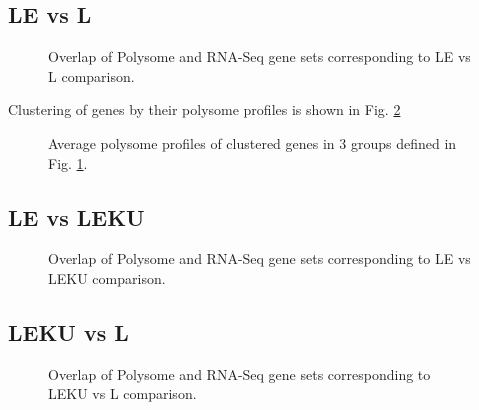 \documentclass[12pt]{article} %
\begin{document}
\subsection{LE vs L} %
\begin{figure}[H] %
\caption{Overlap of Polysome and RNA-Seq gene sets corresponding to LE vs L comparison.}
\label{fig:venn-correlations-LE-L}
\end{figure}

Clustering of genes by their polysome profiles is shown in Fig. \ref{fig:correlations-LE-L}

\begin{figure}[H] %
\caption{Average polysome profiles of clustered genes in 3 groups defined in Fig. \ref{fig:venn-correlations-LE-L}.}
\label{fig:correlations-LE-L}
\end{figure}

\subsection{LE vs LEKU} %
\begin{figure}[H] %
\caption{Overlap of Polysome and RNA-Seq gene sets corresponding to LE vs LEKU comparison.}
\label{fig:venn-correlations-LE-LEKU}
\end{figure}

\subsection{LEKU vs L} %
\begin{figure}[H] %
\caption{Overlap of Polysome and RNA-Seq gene sets corresponding to LEKU vs L comparison.}
\label{fig:venn-correlations-LEKU-L}
\end{figure}




 

\end{document}
